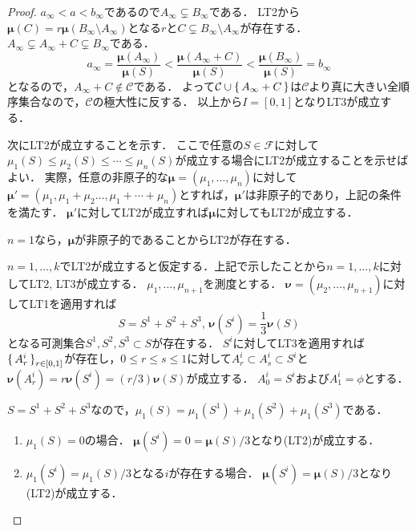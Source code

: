 \begin{proof}
  \(a_\infty < a < b_\infty\)であるので\(A_\infty \subsetneq B_\infty\)である．
  LT2から\(\boldsymbol\mu(C) = r \boldsymbol\mu(B_\infty\setminus A_\infty)\)となる\(r\)と\(C \subsetneq B_\infty\setminus A_\infty\)が存在する．
  \(A_\infty \subsetneq A_\infty + C \subsetneq B_\infty\)である．
  \[
  a_\infty = \frac{\boldsymbol\mu(A_\infty)}{\boldsymbol\mu(S)}
  < \frac{\boldsymbol\mu(A_\infty+C)}{\boldsymbol\mu(S)}
  < \frac{\boldsymbol\mu(B_\infty)}{\boldsymbol\mu(S)} = b_\infty
  \]
  となるので，\(A_\infty + C \not\in \mathcal{C}\)である．
  よって\(\mathcal{C} \cup \set{A_\infty + C}\)は\(\mathcal{C}\)より真に大きい全順序集合なので，\(\mathcal{C}\)の極大性に反する．
  以上から\(I=[0, 1]\)となりLT3が成立する．

  次にLT2が成立することを示す．
  ここで任意の\(S \in \mathcal{F}\)に対して\(\mu_1(S) \leq\mu_2(S) \leq\cdots\leq\mu_n(S)\)が成立する場合にLT2が成立することを示せばよい．
  実際，任意の非原子的な\(\boldsymbol\mu=(\mu_1, \ldots, \mu_n)\)に対して\(\boldsymbol\mu'=(\mu_1, \mu_1+\mu_2 \ldots, \mu_1+\cdots+\mu_n)\)とすれば，\(\boldsymbol\mu'\)は非原子的であり，上記の条件を満たす．
  \(\boldsymbol\mu'\)に対してLT2が成立すれば\(\boldsymbol\mu\)に対してもLT2が成立する．

  \(n=1\)なら，\(\boldsymbol\mu\)が非原子的であることからLT2が存在する．

  \(n=1, \ldots, k\)でLT2が成立すると仮定する．上記で示したことから\(n=1,\ldots, k\)に対してLT2, LT3が成立する．
  \(\mu_1, \ldots, \mu_{n+1}\)を測度とする．
  \(\boldsymbol\nu = (\mu_2, \ldots, \mu_{n+1})\)に対してLT1を適用すれば
  \[ S = S^1 + S^2 + S^3 , \, \boldsymbol\nu(S^i) = \frac{1}{3} \boldsymbol\nu(S) \]
  となる可測集合\(S^1, S^2, S^3 \subset S\)が存在する．
  \(S^i\)に対してLT3を適用すれば\(\set{A_r^i}_{r\in[0,1]}\)が存在し，\(0\leq r\leq s\leq 1\)に対して\(A_r^i \subset A_s^i \subset S^i\)と\(\boldsymbol\nu(A_r^i)=r\boldsymbol\nu(S^i)=(r/3)\boldsymbol\nu(S)\)が成立する．
  \(A_0^i=S^i\)および\(A_1^i=\phi\)とする．

  \(S=S^1+S^2+S^3\)なので，\(\mu_1(S)=\mu_1(S^1)+\mu_1(S^2)+\mu_1(S^3)\)である．
  \begin{enumerate}
    \item \(\mu_1(S)=0\)の場合．
    \(\boldsymbol\mu(S^i) = 0 = \boldsymbol\mu(S)/3\)となり(LT2)が成立する．

    \item \(\mu_1(S^i) = \mu_1(S)/3\)となる\(i\)が存在する場合．
    \(\boldsymbol\mu(S^i) = \boldsymbol\mu(S)/3\)となり(LT2)が成立する．


\end{enumerate}
\end{proof}
